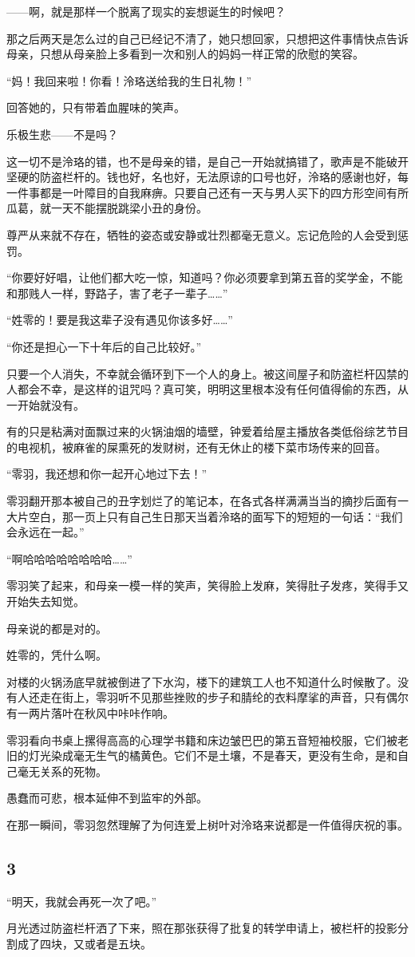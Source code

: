 \documentclass[UTF8, scheme = chinese, openany]{ctexbook}
\begin{document}
——啊，就是那样一个脱离了现实的妄想诞生的时候吧？

那之后两天是怎么过的自己已经记不清了，她只想回家，只想把这件事情快点告诉母亲，只想从母亲脸上多看到一次和别人的妈妈一样正常的欣慰的笑容。

“妈！我回来啦！你看！泠珞送给我的生日礼物！”

回答她的，只有带着血腥味的笑声。

\vspace{1.5em}

乐极生悲——不是吗？

这一切不是泠珞的错，也不是母亲的错，是自己一开始就搞错了，歌声是不能破开坚硬的防盗栏杆的。钱也好，名也好，无法原谅的口号也好，泠珞的感谢也好，每一件事都是一叶障目的自我麻痹。只要自己还有一天与男人买下的四方形空间有所瓜葛，就一天不能摆脱跳梁小丑的身份。

尊严从来就不存在，牺牲的姿态或安静或壮烈都毫无意义。忘记危险的人会受到惩罚。

“你要好好唱，让他们都大吃一惊，知道吗？你必须要拿到第五音的奖学金，不能和那贱人一样，野路子，害了老子一辈子……”

“姓零的！要是我这辈子没有遇见你该多好……”

“你还是担心一下十年后的自己比较好。”

只要一个人消失，不幸就会循环到下一个人的身上。被这间屋子和防盗栏杆囚禁的人都会不幸，是这样的诅咒吗？真可笑，明明这里根本没有任何值得偷的东西，从一开始就没有。

有的只是粘满对面飘过来的火锅油烟的墙壁，钟爱着给屋主播放各类低俗综艺节目的电视机，被麻雀的屎熏死的发财树，还有无休止的楼下菜市场传来的回音。

“零羽，我还想和你一起开心地过下去！”

零羽翻开那本被自己的丑字划烂了的笔记本，在各式各样满满当当的摘抄后面有一大片空白，那一页上只有自己生日那天当着泠珞的面写下的短短的一句话：“我们会永远在一起。”

“啊哈哈哈哈哈哈哈哈……”

零羽笑了起来，和母亲一模一样的笑声，笑得脸上发麻，笑得肚子发疼，笑得手又开始失去知觉。

母亲说的都是对的。

姓零的，凭什么啊。

对楼的火锅汤底早就被倒进了下水沟，楼下的建筑工人也不知道什么时候散了。没有人还走在街上，零羽听不见那些挫败的步子和腈纶的衣料摩挲的声音，只有偶尔有一两片落叶在秋风中咔咔作响。

零羽看向书桌上摞得高高的心理学书籍和床边皱巴巴的第五音短袖校服，它们被老旧的灯光染成毫无生气的橘黄色。它们不是土壤，不是春天，更没有生命，是和自己毫无关系的死物。

愚蠢而可悲，根本延伸不到监牢的外部。

在那一瞬间，零羽忽然理解了为何连爱上树叶对泠珞来说都是一件值得庆祝的事。

\subsection{3}

“明天，我就会再死一次了吧。”

月光透过防盗栏杆洒了下来，照在那张获得了批复的转学申请上，被栏杆的投影分割成了四块，又或者是五块。
\end{document}
